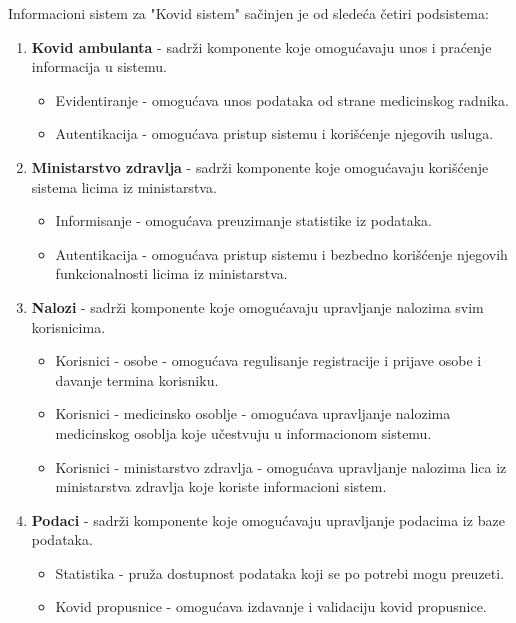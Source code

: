 \documentclass[titlepage]{article}
\begin{document}
Informacioni sistem za "Kovid sistem" sačinjen je od sledeća četiri podsistema:
\begin{enumerate}
    \item \textbf{Kovid ambulanta} - sadrži komponente koje omogućavaju unos i praćenje informacija u sistemu.
	\begin{itemize}
        	\item Evidentiranje - omogućava unos podataka od strane medicinskog radnika.
        	\item Autentikacija - omogućava pristup sistemu i korišćenje njegovih usluga.
    	\end{itemize}
    \item \textbf{Ministarstvo zdravlja} - sadrži komponente koje omogućavaju korišćenje sistema licima iz ministarstva.
	\begin{itemize}
        	\item Informisanje - omogućava preuzimanje statistike iz podataka.
        	\item Autentikacija - omogućava pristup sistemu i bezbedno korišćenje njegovih funkcionalnosti licima iz ministarstva.
    	\end{itemize}
    \item \textbf{Nalozi} - sadrži komponente koje omogućavaju upravljanje nalozima svim korisnicima.
	\begin{itemize}
        	\item Korisnici - osobe - omogućava regulisanje registracije i prijave osobe i davanje termina korisniku.
        	\item Korisnici - medicinsko osoblje - omogućava upravljanje nalozima medicinskog osoblja koje učestvuju u informacionom sistemu.
        	\item Korisnici - ministarstvo zdravlja - omogućava upravljanje nalozima lica iz ministarstva zdravlja koje koriste informacioni sistem.
    	\end{itemize}
     \item \textbf{Podaci} - sadrži komponente koje omogućavaju upravljanje podacima iz baze podataka.
	\begin{itemize}
        	\item Statistika - pruža dostupnost podataka koji se po potrebi mogu preuzeti.
        	\item Kovid propusnice - omogućava izdavanje i validaciju kovid propusnice.
    	\end{itemize}
\end{enumerate}
\end{document}
